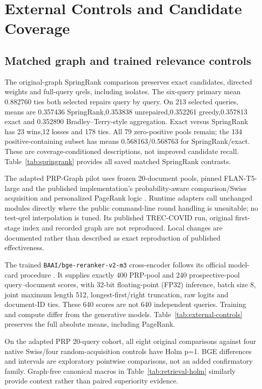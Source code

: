 \documentclass[pdflatex,sn-basic,Numbered]{sn-jnl}
\begin{document}
\section{External Controls and Candidate Coverage}\label{sec:si-controls}
\subsection{Matched graph and trained relevance controls}
The original-graph SpringRank comparison preserves exact candidates, directed weights and full-query qrels, including isolates. The six-query primary mean 0.882760 ties both selected repairs query by query. On 213 selected queries, means are 0.357436 SpringRank,0.353838 unrepaired,0.352261 greedy,0.357813 exact and 0.352890 Bradley--Terry-style aggregation. Exact versus SpringRank has 23 wins,12 losses and 178 ties. All 79 zero-positive pools remain; the 134 positive-containing subset has means 0.568163/0.568763 for SpringRank/exact. These are coverage-conditioned descriptions, not improved candidate recall.
Table~\ref{tab:springrank} provides all saved matched SpringRank contrasts.


The adapted PRP-Graph pilot uses frozen 20-document pools, pinned FLAN-T5-large and the published implementation's probability-aware comparison/Swiss acquisition and personalized PageRank logic \cite{luo2024prpgraph}. Runtime adapters call unchanged modules directly where the public command-line round handling is unsuitable; no test-qrel interpolation is tuned. Its published TREC-COVID run, original first-stage index and recorded graph are not reproduced. Local changes are documented rather than described as exact reproduction of published effectiveness.

The trained \texttt{BAAI/bge-reranker-v2-m3} cross-encoder follows its official model-card procedure \cite{bge2024modelcard}. It supplies exactly 400 PRP-pool and 240 prospective-pool query--document scores, with 32-bit floating-point (FP32) inference, batch size 8, joint maximum length 512, longest-first/right truncation, raw logits and document-ID ties. These 640 scores are not 640 independent queries. Training and compute differ from the generative models. Table~\ref{tab:external-controls} preserves the full absolute means, including PageRank.

On the adapted PRP 20-query cohort, all eight original comparisons against four native Swiss/four random-acquisition controls have Holm p=1. BGE differences and intervals are exploratory pointwise comparisons, not an added confirmatory family. Graph-free canonical macros in Table~\ref{tab:retrieval-holm} similarly provide context rather than paired superiority evidence.
\end{document}
